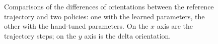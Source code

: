 \begin{figure}[H]
\centering
{}
\hspace{1mm}
\hspace{1mm}
\hspace{1mm}
\caption{Comparisons of the differences of orientations between the reference trajectory and two policies: one with the learned parameters, the other with the hand-tuned parameters. On the $x$ axis are the trajectory steps; on the $y$ axis is the delta orientation.}
\label{fig:throttleexpl}
\end{figure}

